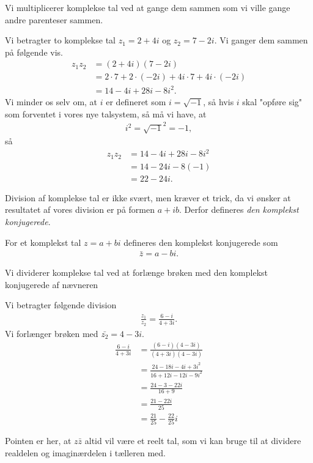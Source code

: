 Vi multiplicerer komplekse tal ved at gange dem sammen som vi ville gange andre parenteser sammen. 
\begin{exa}
	Vi betragter to komplekse tal $z_1 = 2 + 4i$ og $z_2 = 7 - 2i$. Vi ganger dem sammen på følgende vis.
	\begin{align*}
		z_1z_2 &= (2+4i)(7-2i)\\
		&= 2\cdot 7 + 2\cdot(-2i) + 4i\cdot 7 + 4i\cdot (-2i)\\
		&= 14 - 4i + 28i -8i^2.
	\end{align*}
	Vi minder os selv om, at $i$ er defineret som $i=\sqrt{-1}$, så hvis $i$ skal "opføre sig" som forventet i vores nye 
	talsystem, så må vi have, at 
	\begin{align*}
		i^2 = \sqrt{-1}^2 = -1, 
	\end{align*}	 
	så 
	\begin{align*}
		z_1z_2 &= 14 - 4i + 28i -8i^2 \\
		&=14 - 24i -8(-1)\\
		&=22 - 24i.
	\end{align*}
\end{exa}
Division af komplekse tal er ikke svært, men kræver et trick, da vi ønsker at resultatet af vores division er på formen
$a + ib$. Derfor defineres \textit{den komplekst konjugerede}.
\begin{defn}
	For et komplekst tal $z = a + bi$ defineres den komplekst konjugerede som
	\begin{align*}
		\bar{z} = a - bi.
	\end{align*}
\end{defn}
Vi dividerer komplekse tal ved at forlænge brøken med den komplekst konjugerede af nævneren
\begin{exa}
	Vi betragter følgende division
	\begin{align*}
		\frac{z_1}{z_2} = \frac{6-i}{4+3i}.
	\end{align*}
	Vi forlænger brøken med $\bar{z_2} = 4 - 3i$. 
	\begin{align*}
		\frac{6-i}{4+3i} &= \frac{(6-i)(4-3i)}{(4+3i)(4-3i)}\\
		&= \frac{24 -18i-4i+3i^2}{16+12i-12i-9i^2}\\
		&=\frac{24-3 -22i}{16+9}\\
		&=\frac{21-22i}{25}\\
		&=\frac{21}{25}- \frac{22}{25}i
	\end{align*}
\end{exa}
Pointen er her, at $z\bar{z}$ altid vil være et reelt tal, som vi kan bruge til at dividere realdelen og imaginærdelen i tælleren med. 

